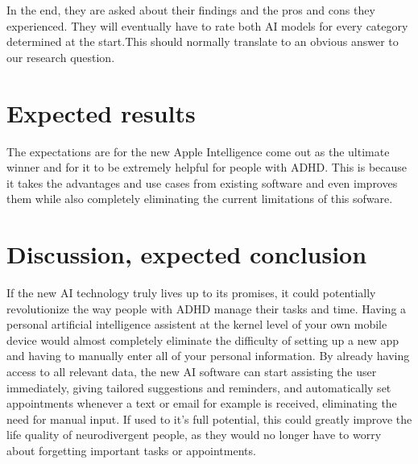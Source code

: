 \documentclass[english]{hogent-article}
\begin{document}
In the end, they are asked about their findings and the pros and cons they experienced. They will eventually have to rate both AI models for every category determined at the start.This should normally translate to an obvious answer to our research question.

%
%
%

\section{Expected results}%
\label{sec:expected-results}


The expectations are for the new Apple Intelligence come out as the ultimate winner and for it to be extremely helpful for people with ADHD. This is because it takes the advantages and use cases from existing software and even improves them while also completely eliminating the current limitations of this sofware.

\section{Discussion, expected conclusion}%
\label{sec:discussion-conclusion}

If the new AI technology truly lives up to its promises, it could potentially revolutionize the way people with ADHD manage their tasks and time.
Having a personal artificial intelligence assistent at the kernel level of your own mobile device would almost completely eliminate the difficulty of setting up a new app and having to manually enter all of your personal information.
By already having access to all relevant data, the new AI software can start assisting the user immediately, giving tailored suggestions and reminders, and automatically set appointments whenever a text or email for example is received, eliminating the need for manual input.
If used to it's full potential, this could greatly improve the life quality of neurodivergent people, as they would no longer have to worry about forgetting important tasks or appointments.


\printbibliography[heading=bibintoc]
\end{document}
